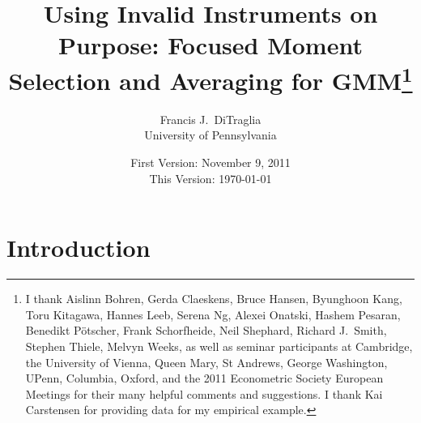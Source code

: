 \documentclass[12pt]{article}
\theoremstyle{definition}
\begin{document}
\title{Using Invalid Instruments on Purpose: Focused Moment Selection and Averaging for GMM\footnote{I thank Aislinn Bohren, Gerda Claeskens, Bruce Hansen, Byunghoon Kang, Toru Kitagawa, Hannes Leeb, Serena Ng, Alexei Onatski, Hashem Pesaran, Benedikt P\"{o}tscher, Frank Schorfheide, Neil Shephard,  Richard J.\ Smith, Stephen Thiele, Melvyn Weeks, as well as seminar participants at Cambridge, the University of Vienna, Queen Mary, St Andrews, George Washington, UPenn, Columbia, Oxford, and the 2011 Econometric Society European Meetings for their many helpful comments and suggestions. I thank Kai Carstensen for providing data for my empirical example.}}

\author{Francis J.\ DiTraglia \\ University of Pennsylvania}

\date{\normalsize First Version: November 9, 2011 \\ This Version: \today}

\maketitle 
\begin{abstract}
	
\end{abstract}

\section{Introduction}
\end{document}
